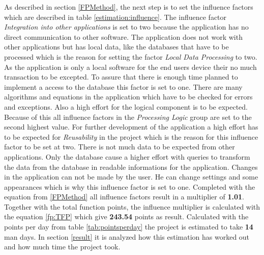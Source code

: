 As described in section \ref{FPMethod}, the next step is to set the influence factors which are described in table \ref{estimation:influence}. The influence factor \textit{Integration into other applications} is set to two because the application has no direct communication to other software. The application does not work with other applications but has local data, like the databases that have to be processed which is the reason for setting the factor \textit{Local Data Processing} to two. As the application is only a local software for the end users device their no much transaction to be excepted. To assure that there is enough time planned to implement a access to the database this factor is set to one. There are many algorithms and equations in the application which have to be checked for errors and exceptions. Also a high effort for the logical component is to be expected. Because of this all influence factors in the \textit{Processing Logic} group are set to the second highest value. For further development of the application a high effort has to be expected for \textit{Reusability} in the project which is the reason for this influence factor to be set at two. There is not much data to be expected from other applications. Only the database cause a higher effort with queries to transform the data from the database in readable informations for the application. Changes in the application can not be made by the user. He can change settings and some appearances which is why this influence factor is set to one. Completed with the equation from \ref{FPMethod} all influence factors result in a multiplier of \textbf{1.01}. Together with the total function points, the influence multiplier is calculated with the equation \ref{fp:TFP} which give \textbf{243.54} points as result. Calculated with the points per day from table \ref{tab:pointsperday} the project is estimated to take \textbf{14} man days. In section \ref{result} it is analyzed how this estimation has worked out and how much time the project took.\\
